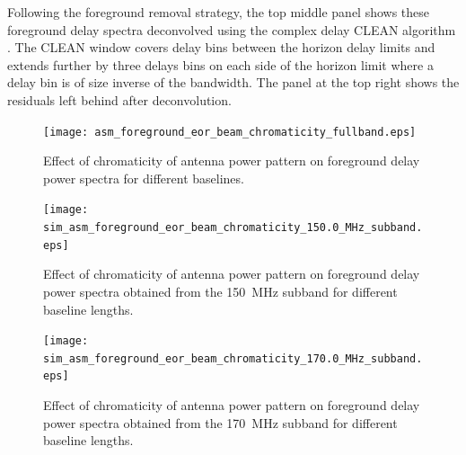 \documentclass[preprint2,iop,numberedappendix,twocolappendix,appendixfloats]{emulateapj}
\begin{document}
Following the foreground removal strategy, the top middle panel shows these foreground delay spectra deconvolved using the complex delay CLEAN algorithm \citep{tay99,par09,par12b}. The CLEAN window covers delay bins between the horizon delay limits and extends further by three delays bins on each side of the horizon limit where a delay bin is of size inverse of the bandwidth. The panel at the top right shows the residuals left behind after deconvolution. 



\begin{figure}[htb]
\centering
\texttt{[image: asm\_foreground\_eor\_beam\_chromaticity\_fullband.eps]}
\caption{Effect of chromaticity of antenna power pattern on foreground delay power spectra for different baselines.}
\label{fig:asm-dps-beam-chromaticity-baselines}
\end{figure}

\begin{figure}[htb]
\centering
\texttt{[image: sim\_asm\_foreground\_eor\_beam\_chromaticity\_150.0\_MHz\_subband.eps]}
\caption{Effect of chromaticity of antenna power pattern on foreground delay power spectra obtained from the 150~MHz subband for different baseline lengths.}
\label{fig:asm-dps-beam-chromaticity-baselines-150-subband}
\end{figure}

\begin{figure}[htb]
\centering
\texttt{[image: sim\_asm\_foreground\_eor\_beam\_chromaticity\_170.0\_MHz\_subband.eps]}
\caption{Effect of chromaticity of antenna power pattern on foreground delay power spectra obtained from the 170~MHz subband for different baseline lengths.}
\label{fig:asm-dps-beam-chromaticity-baselines-170-subband}
\end{figure}
\end{document}
